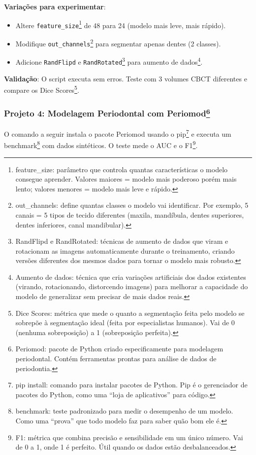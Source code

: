 \textbf{Variações para experimentar}:
\begin{itemize}
    \item Altere \texttt{feature\_size}\protect\footnote{feature\_size: parâmetro que controla quantas características o modelo consegue aprender. Valores maiores = modelo mais poderoso porém mais lento; valores menores = modelo mais leve e rápido.} de 48 para 24 (modelo mais leve, mais rápido).
    \item Modifique \texttt{out\_channels}\protect\footnote{out\_channels: define quantas classes o modelo vai identificar. Por exemplo, 5 canais = 5 tipos de tecido diferentes (maxila, mandíbula, dentes superiores, dentes inferiores, canal mandibular).} para segmentar apenas dentes (2 classes).
    \item Adicione \texttt{RandFlipd} e \texttt{RandRotated}\protect\footnote{RandFlipd e RandRotated: técnicas de aumento de dados que viram e rotacionam as imagens automaticamente durante o treinamento, criando versões diferentes dos mesmos dados para tornar o modelo mais robusto.} para aumento de dados\protect\footnote{Aumento de dados: técnica que cria variações artificiais dos dados existentes (virando, rotacionando, distorcendo imagens) para melhorar a capacidade do modelo de generalizar sem precisar de mais dados reais.}.
\end{itemize}

\textbf{Validação}: O script executa sem erros. Teste com 3 volumes CBCT diferentes e compare os Dice Scores\protect\footnote{Dice Scores: métrica que mede o quanto a segmentação feita pelo modelo se sobrepõe à segmentação ideal (feita por especialistas humanos). Vai de 0 (nenhuma sobreposição) a 1 (sobreposição perfeita).}.

\subsubsection*{Projeto 4: Modelagem Periodontal com Periomod\protect\footnote{Periomod: pacote de Python criado especificamente para modelagem periodontal. Contém ferramentas prontas para análise de dados de periodontia.}}

O comando a seguir instala o pacote Periomod usando o pip\protect\footnote{pip install: comando para instalar pacotes de Python. Pip é o gerenciador de pacotes do Python, como uma ``loja de aplicativos'' para código.} e executa um benchmark\protect\footnote{benchmark: teste padronizado para medir o desempenho de um modelo. Como uma ``prova'' que todo modelo faz para saber quão bom ele é.} com dados sintéticos. O teste mede o AUC e o F1\protect\footnote{F1: métrica que combina precisão e sensibilidade em um único número. Vai de 0 a 1, onde 1 é perfeito. Útil quando os dados estão desbalanceados.}.

